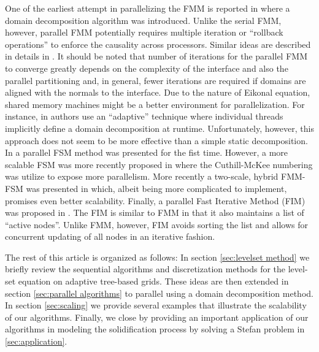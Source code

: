 One of the earliest attempt in parallelizing the FMM is reported in \cite{Herrmann:03:A-domain-decompositi} where a domain decomposition algorithm was introduced. Unlike the serial FMM, however, parallel FMM potentially requires multiple iteration or ``rollback operations'' to enforce the causality across processors. Similar ideas are described in details in \cite{Tugurlan:08:Fast-marching-method}. It should be noted that number of iterations for the parallel FMM to converge greatly depends on the complexity of the interface and also the parallel partitioning and, in general, fewer iterations are required if domains are aligned with the normals to the interface. Due to the nature of Eikonal equation, shared memory machines might be a better environment for parallelization. For instance, in \cite{Breus;Cristiani;Gwosdek;etal:11:An-adaptive-domain-d} authors use an ``adaptive'' technique where individual threads implicitly define a domain decomposition at runtime. Unfortunately, however, this approach does not seem to be more effective than a simple static decomposition. In \cite{Zhao:07:Parallel-implementat} a parallel FSM method was presented for the fist time. However, a more scalable FSM was more recently proposed in \cite{Detrixhe;Gibou;Min:13:A-parallel-fast-swee} where the Cuthill-McKee numbering was utilize to expose more parallelism. More recently a two-scale, hybrid FMM-FSM was presented in \cite{Chacon;Vladimirsky:13:A-parallel-Heap-Cell} which, albeit being more complicated to implement, promises even better scalability. Finally, a parallel Fast Iterative Method (FIM) was proposed in \cite{Jeong;Whitaker:08:A-fast-iterative-met}. The FIM is similar to FMM in that it also maintains a list of ``active nodes''. Unlike FMM, however, FIM avoids sorting the list and allows for concurrent updating of all nodes in an iterative fashion.

The rest of this article is organized as follows: In section \ref{sec:levelset method} we briefly review the sequential algorithms and discretization methods for the level-set equation on adaptive tree-based grids. These ideas are then extended in section \ref{sec:parallel algorithms} to parallel using a domain decomposition method. In section \ref{sec:scaling} we provide several examples that illustrate the scalability of our algorithms. Finally, we close by providing an important application of our algorithms in modeling the solidification process by solving a Stefan problem in \ref{sec:application}.
